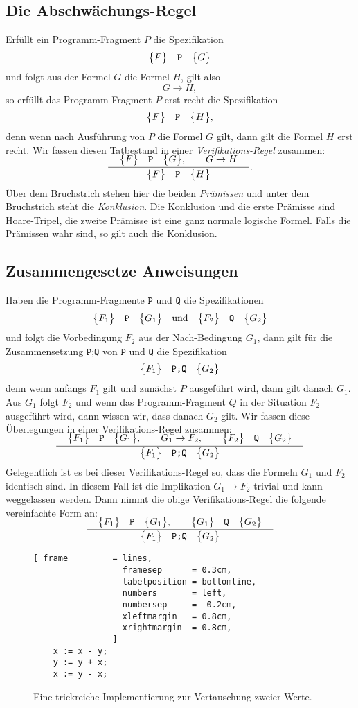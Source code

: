 \subsection{Die Abschw\"achungs-Regel}
Erf\"ullt ein Programm-Fragment $P$ die Spezifikation 
\[ \bigl\{F\bigr\}\quad\texttt{P}\quad\bigl\{G\bigr\} \]
und folgt aus der Formel $G$ die Formel $H$, gilt also
\[ G \rightarrow H, \]
so erf\"ullt das Programm-Fragment $P$ erst recht die Spezifikation 
\[ \bigl\{F\bigr\}\quad\texttt{P}\quad\bigl\{H\bigr\}, \]
denn wenn nach Ausf\"uhrung von $P$ die Formel $G$ gilt, dann gilt die Formel $H$ erst recht.
Wir fassen diesen Tatbestand in einer \emph{Verifikations-Regel} zusammen:
\\[-0.2cm]
\[ \bruch{\quad \hoare{F}{P}{G}, \qquad G \rightarrow H \quad}{\hoare{F}{P}{H}}. \]
Über dem Bruchstrich stehen hier die beiden \emph{Pr\"amissen} und unter dem Bruchstrich steht
die \emph{Konklusion}.  Die Konklusion und die erste Pr\"amisse sind 
Hoare-Tripel, die zweite Pr\"amisse  ist eine ganz normale logische Formel.
Falls die Pr\"amissen wahr sind, so gilt auch die Konklusion.

\subsection{Zusammengesetze Anweisungen}
Haben die Programm-Fragmente $\texttt{P}$ und $\texttt{Q}$ die Spezifikationen
\[ \bigl\{F_1\bigr\}\quad\texttt{P}\quad\bigl\{G_1\bigr\}  \quad \mathrm{und} \quad \bigl\{F_2\bigr\}\quad\texttt{Q}\quad\bigl\{G_2\bigr\}  \]
und folgt die Vorbedingung $F_2$ aus der Nach-Bedingung $G_1$, dann gilt f\"ur die 
Zusammensetzung $\texttt{P;Q}$ von $\texttt{P}$ und $\texttt{Q}$ die
Spezifikation 
\[ \bigl\{F_1\bigr\}\quad\texttt{P;Q}\quad\bigl\{G_2\bigr\} \]
denn wenn anfangs $F_1$ gilt und zun\"achst $P$ ausgef\"uhrt wird, dann gilt danach $G_1$.
Aus $G_1$ folgt $F_2$ und wenn das Programm-Fragment $Q$ in der Situation $F_2$ ausgef\"uhrt
wird, dann wissen wir, dass danach $G_2$ gilt.
Wir fassen diese Überlegungen in einer Verifikations-Regel zusammen:
\\[-0.2cm]
\[ \bruch{\quad\hoare{F_1}{P}{G_1}, \qquad G_1 \rightarrow F_2, \qquad \hoare{F_2}{Q}{G_2}\quad}{
    \hoare{F_1}{P;Q}{G_2}} \]
Gelegentlich ist es bei dieser Verifikations-Regel so, 
dass die Formeln $G_1$ und $F_2$  identisch sind.  In diesem Fall ist die Implikation
$G_1 \rightarrow F_2$ trivial und kann weggelassen werden.  Dann nimmt die obige
Verifikations-Regel die folgende vereinfachte Form an:
\\[-0.2cm]
\[ \bruch{\quad\hoare{F_1}{P}{G_1}, \qquad \hoare{G_1}{Q}{G_2}\quad}{ \hoare{F_1}{P;Q}{G_2}} \]

\begin{figure}[!ht]
\centering
\begin{Verbatim}[ frame         = lines, 
                  framesep      = 0.3cm, 
                  labelposition = bottomline,
                  numbers       = left,
                  numbersep     = -0.2cm,
                  xleftmargin   = 0.8cm,
                  xrightmargin  = 0.8cm,
                ]
    x := x - y;
    y := y + x;
    x := y - x;
\end{Verbatim}
\vspace*{-0.3cm}
\caption{Eine trickreiche Implementierung zur Vertauschung zweier Werte.}
\label{fig:swap}
\end{figure}

